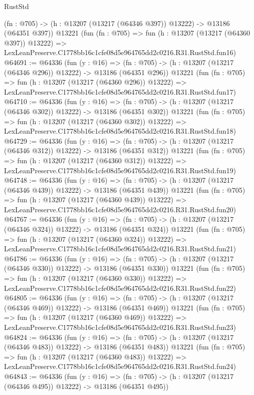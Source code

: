 \begin{lexlean}{RustStd}
\begin{coremodule}
    (fn : @705) -> (h : @13207 (@13217 (@64346 @397)) @13222) -> @13186 (@64351 @397))
    @13221
    (fun (fn : @705) =>
    fun (h : @13207 (@13217 (@64360 @397)) @13222) =>
    LexLeanPreserve.C1778bb16c1cfe08d5e964765dd2c0216.R31.RustStd.fun16)
@64691 := @64336
    (fun (y : @16) =>
    (fn : @705) -> (h : @13207 (@13217 (@64346 @296)) @13222) -> @13186 (@64351 @296))
    @13221
    (fun (fn : @705) =>
    fun (h : @13207 (@13217 (@64360 @296)) @13222) =>
    LexLeanPreserve.C1778bb16c1cfe08d5e964765dd2c0216.R31.RustStd.fun17)
@64710 := @64336
    (fun (y : @16) =>
    (fn : @705) -> (h : @13207 (@13217 (@64346 @302)) @13222) -> @13186 (@64351 @302))
    @13221
    (fun (fn : @705) =>
    fun (h : @13207 (@13217 (@64360 @302)) @13222) =>
    LexLeanPreserve.C1778bb16c1cfe08d5e964765dd2c0216.R31.RustStd.fun18)
@64729 := @64336
    (fun (y : @16) =>
    (fn : @705) -> (h : @13207 (@13217 (@64346 @312)) @13222) -> @13186 (@64351 @312))
    @13221
    (fun (fn : @705) =>
    fun (h : @13207 (@13217 (@64360 @312)) @13222) =>
    LexLeanPreserve.C1778bb16c1cfe08d5e964765dd2c0216.R31.RustStd.fun19)
@64748 := @64336
    (fun (y : @16) =>
    (fn : @705) -> (h : @13207 (@13217 (@64346 @439)) @13222) -> @13186 (@64351 @439))
    @13221
    (fun (fn : @705) =>
    fun (h : @13207 (@13217 (@64360 @439)) @13222) =>
    LexLeanPreserve.C1778bb16c1cfe08d5e964765dd2c0216.R31.RustStd.fun20)
@64767 := @64336
    (fun (y : @16) =>
    (fn : @705) -> (h : @13207 (@13217 (@64346 @324)) @13222) -> @13186 (@64351 @324))
    @13221
    (fun (fn : @705) =>
    fun (h : @13207 (@13217 (@64360 @324)) @13222) =>
    LexLeanPreserve.C1778bb16c1cfe08d5e964765dd2c0216.R31.RustStd.fun21)
@64786 := @64336
    (fun (y : @16) =>
    (fn : @705) -> (h : @13207 (@13217 (@64346 @330)) @13222) -> @13186 (@64351 @330))
    @13221
    (fun (fn : @705) =>
    fun (h : @13207 (@13217 (@64360 @330)) @13222) =>
    LexLeanPreserve.C1778bb16c1cfe08d5e964765dd2c0216.R31.RustStd.fun22)
@64805 := @64336
    (fun (y : @16) =>
    (fn : @705) -> (h : @13207 (@13217 (@64346 @469)) @13222) -> @13186 (@64351 @469))
    @13221
    (fun (fn : @705) =>
    fun (h : @13207 (@13217 (@64360 @469)) @13222) =>
    LexLeanPreserve.C1778bb16c1cfe08d5e964765dd2c0216.R31.RustStd.fun23)
@64824 := @64336
    (fun (y : @16) =>
    (fn : @705) -> (h : @13207 (@13217 (@64346 @483)) @13222) -> @13186 (@64351 @483))
    @13221
    (fun (fn : @705) =>
    fun (h : @13207 (@13217 (@64360 @483)) @13222) =>
    LexLeanPreserve.C1778bb16c1cfe08d5e964765dd2c0216.R31.RustStd.fun24)
@64843 := @64336
    (fun (y : @16) =>
    (fn : @705) -> (h : @13207 (@13217 (@64346 @495)) @13222) -> @13186 (@64351 @495))

\end{coremodule}
\end{lexlean}
